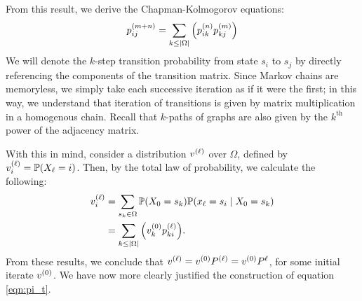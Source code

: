 \documentclass[../exploring-pagerank.tex]{subfiles}
\begin{document}
	From this result, we derive the Chapman-Kolmogorov equations:
	\begin{equation}
	        p^{(m+n)}_{ij} = \sum_{k\leq |\Omega|}{\left( p^{(n)}_{ik} p^{(m)}_{kj} \right)}
	\end{equation}
    We will denote the $k$-step transition probability from state $s_i$ to $s_j$ by directly referencing the components of the transition matrix. Since Markov chains are memoryless, we simply take each successive iteration as if it were the first; in this way, we understand that iteration of transitions is given by matrix multiplication in a homogenous chain. Recall that $k$-paths of graphs are also given by the $k^\text{th}$ power of the adjacency matrix. 
    
    With this in mind, consider a distribution $v^{(\ell)}$ over $\Omega$, defined by $v^{(\ell)}_i = \mathbb{P}(X_\ell = i)$. Then, by the total law of probability, we calculate the following:
    \begin{align*}
        v^{(\ell)}_i &= \sum_{s_k\in\Omega}{\mathbb{P}(X_0 = s_k) \mathbb{P}(x_\ell = s_i \mid X_0 = s_k)} \\
        &= \sum_{k\leq |\Omega|}{\left( v^{(0)}_k p^{(\ell)}_{ki} \right)}.
    \end{align*}
    From these results, we conclude that $v^{(\ell)} = v^{(0)} P^{(\ell)} = v^{(0)} P^\ell$, for some initial iterate $v^{(0)}$. We have now more clearly justified the construction of equation \eqref{eqn:pi_t}.
    
\end{document}
